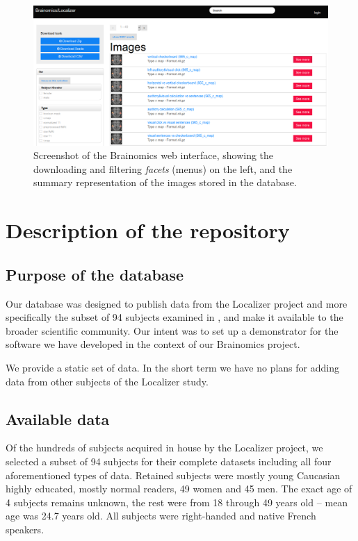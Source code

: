 \documentclass[review]{elsarticle}
\begin{document}
\begin{figure}[ht!]
    \includegraphics[width=\textwidth]{ui1}
    \caption{Screenshot of the Brainomics web interface, showing the downloading and filtering \emph{facets} (menus) on the left, and the summary representation of the images stored in the database.}
    \label{fig:ui}
\end{figure}


\section{Description of the repository}

\subsection{Purpose of the database}

Our database was designed to publish data from the Localizer project \cite{Pinel2007} and more specifically the subset of 94 subjects examined in \cite{Pinel2012}, and make it available to the broader scientific community. Our intent was to set up a demonstrator for the software we have developed in the context of our Brainomics project.

We provide a static set of data. In the short term we have no plans for adding data from other subjects of the Localizer study.


\subsection{Available data}

Of the hundreds of subjects acquired in house by the Localizer project, we selected a subset of 94 subjects for their complete datasets \cite{Pinel2012} including all four aforementioned types of data. Retained subjects were mostly young Caucasian highly educated, mostly normal readers, 49 women and 45 men. The exact age of 4 subjects remains unknown, the rest were from 18 through 49 years old -- mean age was 24.7 years old. All subjects were right-handed and native French speakers.
\end{document}
